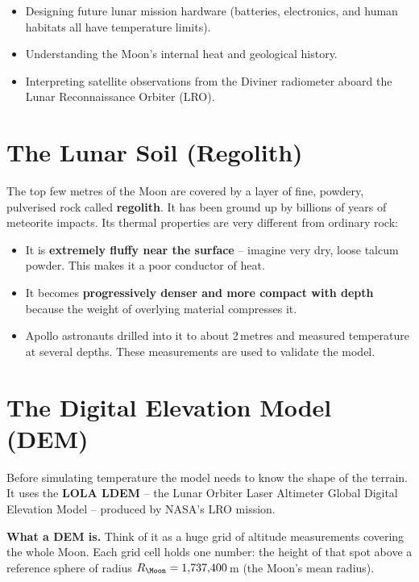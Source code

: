 \documentclass[12pt, a4paper]{article}
\begin{document}
\begin{itemize}[leftmargin=1.5em, itemsep=2pt]
  \item Designing future lunar mission hardware (batteries,
        electronics, and human habitats all have temperature limits).
  \item Understanding the Moon's internal heat and geological history.
  \item Interpreting satellite observations from the Diviner radiometer
        aboard the Lunar Reconnaissance Orbiter (LRO).
\end{itemize}

\section{The Lunar Soil (Regolith)}

The top few metres of the Moon are covered by a layer of fine,
powdery, pulverised rock called \textbf{regolith}.
It has been ground up by billions of years of meteorite impacts.
Its thermal properties are very different from ordinary rock:

\begin{itemize}[leftmargin=1.5em, itemsep=2pt]
  \item It is \textbf{extremely fluffy near the surface} --
        imagine very dry, loose talcum powder.
        This makes it a poor conductor of heat.
  \item It becomes \textbf{progressively denser and more compact
        with depth} because the weight of overlying material
        compresses it.
  \item Apollo astronauts drilled into it to about 2\,metres and
        measured temperature at several depths.
        These measurements are used to validate the model.
\end{itemize}

\section{The Digital Elevation Model (DEM)}

Before simulating temperature the model needs to know the shape of
the terrain.
It uses the \textbf{LOLA LDEM} -- the Lunar Orbiter Laser Altimeter
Global Digital Elevation Model -- produced by NASA's LRO mission.

\begin{plainbox}
  \textbf{What a DEM is.}
  Think of it as a huge grid of altitude measurements covering
  the whole Moon.
  Each grid cell holds one number: the height of that spot above
  a reference sphere of radius
  $R_{\Moon} = 1{,}737{,}400$\,m (the Moon's mean radius).
\end{plainbox}
\end{document}
